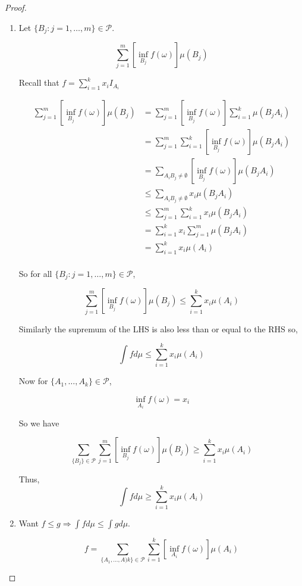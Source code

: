 \documentclass[11pt,fleqn]{book} %
\begin{document}
\begin{proof}
	\begin{enumerate}
		\item Let $\{B_j: j = 1, \dots, m\} \in \mathcal{P}$. 

				$$\sum^m_{j = 1} [\inf_{B_j} f(\omega)] \mu(B_j) $$

		Recall that $f = \sum^k_{i =1} x_i I_{A_i}$

			\begin{align*}
				\sum^m_{j = 1} [\inf_{B_j} f(\omega)] \mu(B_j)  &= \sum^m_{j = 1} [\inf_{B_j} f(\omega)] \sum^k_{i=1} \mu(B_j A_i) \\
					&= \sum^m_{j=1} \sum^k_{i = 1}[\inf_{B_j} f(\omega)] \mu(B_j A_i) \\
					&= \sum_{A_i B_j \neq \emptyset}  [\inf_{B_j} f(\omega)] \mu(B_j A_i)\\
					&\leq \sum_{A_i B_j \neq \emptyset}  x_i \mu(B_j A_i)\\
					&\leq \sum^m_{j=1} \sum^k_{i = 1} x_i \mu(B_j A_i)\\
					&= \sum^k_{i = 1} x_i \sum^m_{j=1}  \mu(B_j A_i)\\
					&= \sum^k_{i = 1} x_i  \mu( A_i)\\
			\end{align*}

			So for all $\{B_j: j = 1, \dots, m\} \in \mathcal{P}$, 

					$$\sum^m_{j = 1} [\inf_{B_j} f(\omega)] \mu(B_j)  \leq \sum^k_{i = 1} x_i  \mu( A_i)$$

			Similarly the supremum of the LHS is also less than or equal to the RHS so, 

					$$\int f d\mu \leq \sum^k_{i = 1} x_i  \mu( A_i) $$

			Now for $\{A_1, \dots, A_k\} \in \mathcal{P}$,

					$$\inf_{A_i} f(\omega) = x_i $$


			So we have
			
					$$\sum_{\{B_j\} \in \mathcal{P}}\sum^m_{j = 1} [\inf_{B_j} f(\omega)] \mu(B_j)  \geq \sum^k_{i = 1} x_i  \mu( A_i)  $$	

			Thus,
					$$\int f d\mu \geq \sum^k_{i = 1} x_i  \mu( A_i) $$
			 
			\item Want $f \leq g \Rightarrow \int f d \mu \leq \int g d\mu$. 

					$$f = \sum_{\{A_1, \dots, A)k\} \in \mathcal{P}} \sum^k_{i = 1} [\inf_{A_i} f(\omega)] \mu(A_i)  $$


\end{enumerate}
\end{proof}
\end{document}
